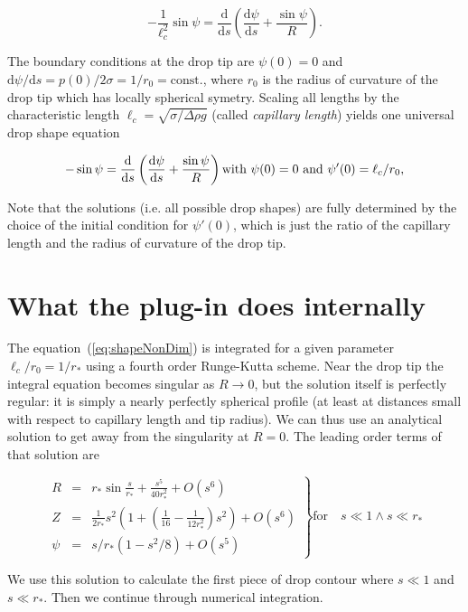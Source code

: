 \documentclass[fleqn]{scrartcl}
\newcommand{\ud}{\mathrm{d}}%
\begin{document}
\[\label{eq:shape}
  - \frac{1}{\ell_c^2} \sin\psi =
  \frac{\ud}{\ud s}\left( \frac{\ud\psi}{\ud s} + \frac{\sin\psi}{R} \right).
\]

 The boundary conditions at the drop tip are $\psi(0)=0$ and $\ud\psi
/ \ud s = p(0)/2\sigma = 1/r_0 = \mathrm{const.}$, where $r_0$ is the
radius of curvature of the drop tip which has locally spherical
symetry. Scaling all lengths by the characteristic length $\ell_c =
\sqrt{\sigma/\Delta\!\rho g}$ (called \emph{capillary length}) yields
one universal drop shape equation

\begin{equation}\label{eq:shapeNonDim}
  - \sin\psi =
  \frac{\ud}{\ud s}\left( \frac{\ud\psi}{\ud s} + \frac{\sin\psi}{R} \right)\\
  \mbox{with } \psi(0)=0 \mbox{ and } \psi'(0) = \ell_c/r_0,
\end{equation}

Note that the solutions (i.e. all possible drop shapes) are fully
determined by the choice of the initial condition for $\psi'(0)$,
which is just the ratio of the capillary length and the radius of
curvature of the drop tip.

\section{What the plug-in does internally}
\label{sec:numerics}

The equation~(\ref{eq:shapeNonDim}) is integrated for a given parameter
$\ell_c/r_0 = 1/r_*$ using a fourth order Runge-Kutta scheme. Near the
drop tip the integral equation becomes singular as $R\to 0$, but the
solution itself is perfectly regular: it is simply a nearly perfectly
spherical profile (at least at distances small with respect to
capillary length and tip radius). We can thus use an analytical
solution to get away from the singularity at $R=0$. The leading order
terms of that solution are

\[
\left.%
\begin{array}{lll}
R & = & r_*\sin\frac{s}{r_*} + \frac{s^5}{40 r_*^2} + O(s^6) \\
Z & = & \frac{1}{2r_*} s^2 (1 + (\frac{1}{16} - \frac{1}{12r_*^2}) s^2) + O(s^6)\\
\psi & = & s/r_* (1-s^2/8) + O(s^5)
\end{array}\right\}
\mathrm{for}\quad s \ll 1 \wedge s \ll r_*
\]

We use this solution to calculate the first piece of drop contour
where $s \ll 1$ and $s \ll r_*$. Then we continue through numerical
integration.
\end{document}
